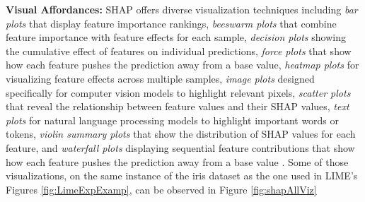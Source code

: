 \textbf{Visual Affordances:} SHAP offers diverse visualization techniques including \textit{bar plots} that display feature importance rankings, \textit{beeswarm plots} that combine feature importance with feature effects for each sample, \textit{decision plots} showing the cumulative effect of features on individual predictions, \textit{force plots} that show how each feature pushes the prediction away from a base value, \textit{heatmap plots} for visualizing feature effects across multiple samples, \textit{image plots} designed specifically for computer vision models to highlight relevant pixels, \textit{scatter plots} that reveal the relationship between feature values and their SHAP values, \textit{text plots} for natural language processing models to highlight important words or tokens, \textit{violin summary plots} that show the distribution of SHAP values for each feature, and \textit{waterfall plots} displaying sequential feature contributions that show how each feature pushes the prediction away from a base value \cite{shapDocumentationOnline}. Some of those visualizations, on the same instance of the iris dataset as the one used in LIME's Figures \ref{fig:LimeExpExamp}, can be observed in Figure \ref{fig:shapAllViz}

